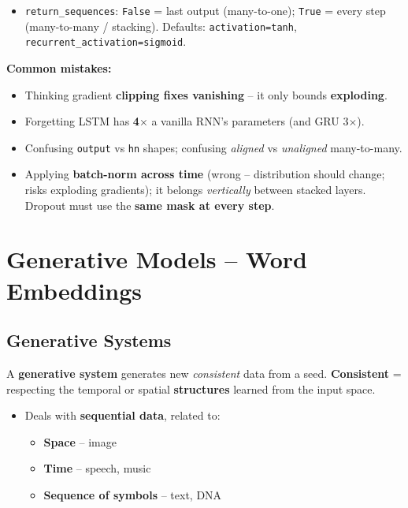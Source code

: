 \documentclass[10pt,a4paper]{article}
\begin{document}
\begin{examtipbox}
\begin{itemize}[leftmargin=*, nosep]
			\item \texttt{return\_sequences}: \texttt{False} = last output (many-to-one); \texttt{True} = every step (many-to-many / stacking). Defaults: \texttt{activation=tanh}, \texttt{recurrent\_activation=sigmoid}.
		\end{itemize}
		\textbf{Common mistakes:}
		\begin{itemize}[leftmargin=*, nosep]
			\item Thinking gradient \textbf{clipping fixes vanishing} -- it only bounds \textbf{exploding}.
			\item Forgetting LSTM has \textbf{4$\times$} a vanilla RNN's parameters (and GRU 3$\times$).
			\item Confusing \texttt{output} vs \texttt{hn} shapes; confusing \emph{aligned} vs \emph{unaligned} many-to-many.
			\item Applying \textbf{batch-norm across time} (wrong -- distribution should change; risks exploding gradients); it belongs \emph{vertically} between stacked layers. Dropout must use the \textbf{same mask at every step}.
		\end{itemize}
	\end{examtipbox}
	
	\section{Generative Models -- Word Embeddings}

	\subsection{Generative Systems}

	\begin{definitionbox}
		A \textbf{generative system} generates new \emph{consistent} data from a seed. \textbf{Consistent} = respecting the temporal or spatial \textbf{structures} learned from the input space.
	\end{definitionbox}

	\begin{itemize}[leftmargin=*]
		\item Deals with \textbf{sequential data}, related to:
		\begin{itemize}[leftmargin=*]
			\item \textbf{Space} -- image
			\item \textbf{Time} -- speech, music
			\item \textbf{Sequence of symbols} -- text, DNA
		\end{itemize}
	\end{itemize}
\end{document}

